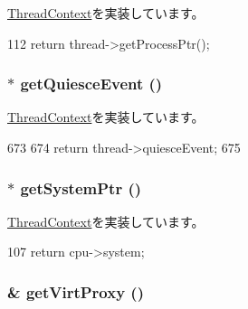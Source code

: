\hyperlink{classThreadContext_a8725d0e5dce89a4a086c7de4bb9d4454}{ThreadContext}を実装しています。


\begin{DoxyCode}
112 { return thread->getProcessPtr(); }
\end{DoxyCode}
\hypertarget{classOzoneCPU_1_1OzoneTC_a62d5bde0391e38cd7463a35e98d5c742}{
\subsubsection[{getQuiesceEvent}]{ $\ast$ getQuiesceEvent ()}}
\label{classOzoneCPU_1_1OzoneTC_a62d5bde0391e38cd7463a35e98d5c742}


\hyperlink{classThreadContext_ace05cbb8c4644ab69ad2ce815a259669}{ThreadContext}を実装しています。


\begin{DoxyCode}
673 {
674     return thread->quiesceEvent;
675 }
\end{DoxyCode}
\hypertarget{classOzoneCPU_1_1OzoneTC_af7bdb56e0088b380302741ad9008f321}{
\subsubsection[{getSystemPtr}]{$\ast$ getSystemPtr ()}}
\label{classOzoneCPU_1_1OzoneTC_af7bdb56e0088b380302741ad9008f321}


\hyperlink{classThreadContext_a4585cb7174e215741001b70fafe6662e}{ThreadContext}を実装しています。


\begin{DoxyCode}
107 { return cpu->system; }
\end{DoxyCode}
\hypertarget{classOzoneCPU_1_1OzoneTC_ac7399661f9073ba4ec121b87c782924b}{
\subsubsection[{getVirtProxy}]{\& getVirtProxy ()}}
\label{classOzoneCPU_1_1OzoneTC_ac7399661f9073ba4ec121b87c782924b}


